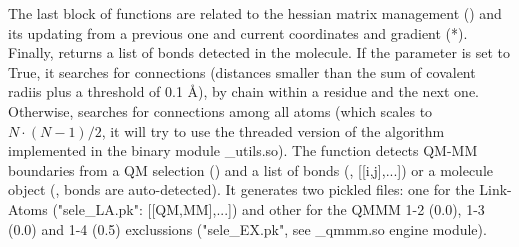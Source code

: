 The last block of functions are related to the hessian matrix management () and its updating from a previous one and current coordinates and gradient (*).\\
Finally,  returns a list of bonds detected in the molecule. If the parameter  is set to True, it searches for connections (distances smaller than the sum of covalent radiis plus a threshold of 0.1 Å), by chain within a residue and the next one. Otherwise, searches for connections among all atoms (which scales to $N \cdot (N-1)/2$, it will try to use the threaded version of the algorithm implemented in the binary module \_utils.so). The function
 detects QM-MM boundaries from a QM selection () and a list of bonds (, [[i,j],...]) or a molecule object (, bonds are auto-detected). It generates two pickled files: one for the Link-Atoms ("sele\_LA.pk": [[QM,MM],...]) and other for the QMMM 1-2 (0.0), 1-3 (0.0) and 1-4 (0.5) exclussions ("sele\_EX.pk", see \_qmmm.so engine module).
\footnotesize
